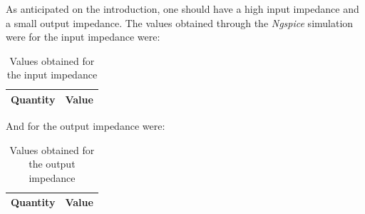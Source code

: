 As anticipated on the introduction, one should have a high input impedance and a small output impedance. The values obtained through the \textit{Ngspice} simulation were for the input impedance were:

\begin{table}[H]
    \centering
    \begin{tabular}{c|c}
        \textbf{Quantity} & \textbf{Value}\\
        \hline
        \hline
        
    \end{tabular}
    \caption{Values obtained for the input impedance}
    \label{tab:zin}
\end{table}

And for the output impedance were:

\begin{table}[H]
    \centering
    \begin{tabular}{c|c}
        \textbf{Quantity} & \textbf{Value}\\
        \hline
        \hline
        
    \end{tabular}
    \caption{Values obtained for the output impedance}
    \label{tab:zout}
\end{table}